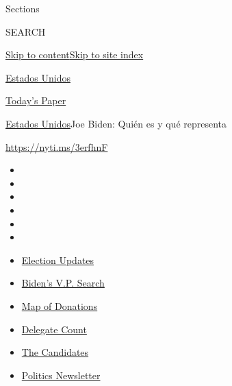 Sections

SEARCH

\protect\hyperlink{site-content}{Skip to
content}\protect\hyperlink{site-index}{Skip to site index}

\href{https://www.nytimes.com/es/section/estados-unidos}{Estados Unidos}

\href{https://myaccount.nytimes.com/auth/login?response_type=cookie\&client_id=vi}{}

\href{https://www.nytimes.com/section/todayspaper}{Today's Paper}

\href{/es/section/estados-unidos}{Estados Unidos}\textbar{}Joe Biden:
Quién es y qué representa

\url{https://nyti.ms/3erfhnF}

\begin{itemize}
\item
\item
\item
\item
\item
\item
\end{itemize}

\begin{itemize}
\item
  \href{https://www.nytimes.com/2020/07/31/us/elections/biden-vs-trump.html?action=click\&pgtype=Article\&state=default\&region=TOP_BANNER\&context=storylines_menu}{Election
  Updates}
\item
  \href{https://www.nytimes.com/article/biden-vice-president-2020.html?action=click\&pgtype=Article\&state=default\&region=TOP_BANNER\&context=storylines_menu}{Biden's
  V.P. Search}
\item
  \href{https://www.nytimes.com/interactive/2020/07/24/us/politics/trump-biden-campaign-donors.html?action=click\&pgtype=Article\&state=default\&region=TOP_BANNER\&context=storylines_menu}{Map
  of Donations}
\item
  \href{https://www.nytimes.com/interactive/2020/us/elections/delegate-count-primary-results.html?action=click\&pgtype=Article\&state=default\&region=TOP_BANNER\&context=storylines_menu}{Delegate
  Count}
\item
  \href{https://www.nytimes.com/interactive/2019/us/politics/2020-presidential-candidates.html?action=click\&pgtype=Article\&state=default\&region=TOP_BANNER\&context=storylines_menu}{The
  Candidates}
\item
  \href{https://www.nytimes.com/newsletters/politics?action=click\&pgtype=Article\&state=default\&region=TOP_BANNER\&context=storylines_menu}{Politics
  Newsletter}
\end{itemize}

